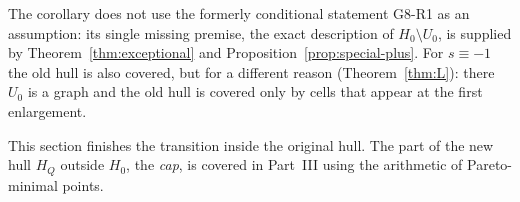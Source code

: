 The corollary does not use the formerly conditional statement G8-R1 as an assumption: its single missing premise, the exact description of $H_0\setminus U_0$, is supplied by Theorem~\ref{thm:exceptional} and Proposition~\ref{prop:special-plus}. For $s\equiv-1$ the old hull is also covered, but for a different reason (Theorem~\ref{thm:L}): there $U_0$ is a graph and the old hull is covered only by cells that appear at the first enlargement.

This section finishes the transition inside the original hull. The part of the new hull $H_Q$ outside $H_0$, the \emph{cap}, is covered in Part~III using the arithmetic of Pareto-minimal points.
